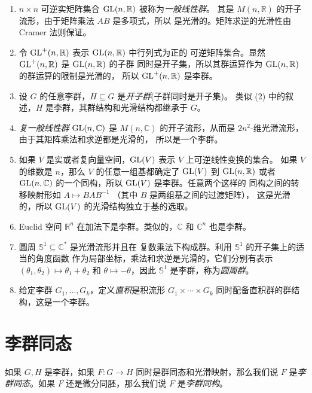 \begin{example}[李群]
  \mbox{}
  \begin{enumerate}
    \item $n\times n$ 可逆实矩阵集合 $\operatorname{GL}(n,\mathbb{R})$ 被称为\emph{一般线性群}。
    其是 $M(n,\mathbb{R})$ 的开子流形，由于矩阵乘法 $AB$ 是多项式，所以
    是光滑的。矩阵求逆的光滑性由 Cramer 法则保证。
    \item 令 $\operatorname{GL}^+(n,\mathbb{R})$ 表示 $\operatorname{GL}(n,\mathbb{R})$ 中行列式为正的
    可逆矩阵集合。显然 $\operatorname{GL}^+(n,\mathbb{R})$ 是 $\operatorname{GL}(n,\mathbb{R})$ 的子群
    同时是开子集，所以其群运算作为 $\operatorname{GL}(n,\mathbb{R})$ 的群运算的限制是光滑的，
    所以 $\operatorname{GL}^+(n,\mathbb{R})$ 是李群。
    \item 设 $G$ 的任意李群，$H\subseteq G$ 是\emph{开子群}(子群同时是开子集)。
    类似 (2) 中的叙述，$H$ 是李群，其群结构和光滑结构都继承于 $G$。
    \item \emph{复一般线性群} $\operatorname{GL}(n,\mathbb{C})$ 是 $M(n,\mathbb{C})$
    的开子流形，从而是 $2n^2$-维光滑流形，由于其矩阵乘法和求逆都是光滑的，
    所以是一个李群。
    \item 如果 $V$ 是实或者复向量空间，$\operatorname{GL}(V)$ 表示 $V$ 上可逆线性变换的集合。
    如果 $V$ 的维数是 $n$，那么 $V$ 的任意一组基都确定了 $\operatorname{GL}(V)$ 到 $\operatorname{GL}(n,\mathbb{R})$
    或者 $\operatorname{GL}(n,\mathbb{C})$ 的一个同构，所以 $\operatorname{GL}(V)$ 是李群。任意两个这样的
    同构之间的转移映射形如 $A\mapsto BAB^{-1}$ （其中 $B$ 是两组基之间的过渡矩阵），
    这是光滑的，所以 $\operatorname{GL}(V)$ 的光滑结构独立于基的选取。
    \item Euclid 空间 $\mathbb{R}^n$ 在加法下是李群。类似的，$\mathbb{C}$
    和 $\mathbb{C}^n$ 也是李群。
    \item 圆周 $\mathbb{S}^1\subseteq \mathbb{C^*}$ 是光滑流形并且在
    复数乘法下构成群。利用 $\mathbb{S}^1$ 的开子集上的适当的角度函数
    作为局部坐标，乘法和求逆是光滑的，它们分别有表示 $(\theta_1,\theta_2)\mapsto\theta_1+\theta_2$
    和 $\theta\mapsto -\theta$，因此 $\mathbb{S}^1$ 是李群，称为\emph{圆周群}。
    \item 给定李群 $G_1,\dots,G_k$，定义\emph{直积}是积流形 $G_1\times\cdots\times G_k$
    同时配备直积群的群结构，这是一个李群。
  \end{enumerate}
\end{example}

\section{李群同态}

如果 $G,H$ 是李群，如果 $F:G\to H$ 同时是群同态和光滑映射，那么我们说
$F$ 是\emph{李群同态}。如果 $F$ 还是微分同胚，那么我们说 $F$
是\emph{李群同构}。

